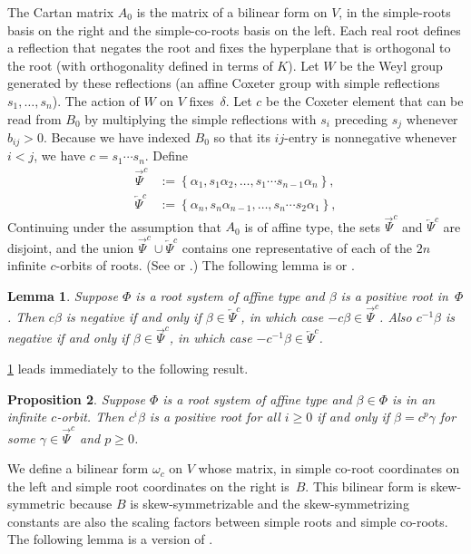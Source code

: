 \documentclass{amsart}
\newtheorem{proposition}{Proposition}[section]
\newtheorem{lemma}[proposition]{Lemma}
\theoremstyle{definition}
\theoremstyle{remark}
\numberwithin{equation}{section}
\newcommand{\set}[1]{{\left\lbrace #1 \right\rbrace}}
\newcommand{\0}{{\mathbf{0}}}
\newcommand{\RSChar}{\Phi}
\newcommand{\RS}{\RSChar}
\newcommand{\TravInfChar}{\Psi}
\newcommand{\TravProj}[1]{\overrightarrow{\TravInfChar}^{#1}}
\newcommand{\TravInj}[1]{\overleftarrow{\TravInfChar}^{#1}}
\begin{document}
The Cartan matrix $A_0$ is the matrix of a bilinear form on $V$, in the simple-roots basis on the right and the simple-co-roots basis on the left.
Each real root defines a reflection that negates the root and fixes the hyperplane that is orthogonal to the root (with orthogonality defined in terms of $K$).
Let $W$ be the Weyl group generated by these reflections (an affine Coxeter  group with simple reflections $s_1,\ldots,s_n$).
The action of $W$ on $V$ fixes~$\delta$.
Let $c$ be the Coxeter element that can be read from $B_0$ by multiplying the simple reflections with $s_i$ preceding $s_j$ whenever $b_{ij}>0$.
Because we have indexed $B_0$ so that its $ij$-entry is nonnegative whenever $i<j$, we have $c=s_1\cdots s_n$.
Define
\begin{align}
\label{rep->}
\TravProj{c}&:=\set{\alpha_1,s_1\alpha_2,\ldots,s_1\cdots s_{n-1}\alpha_n},\\
\label{rep<-}
\TravInj{c}&:=\set{\alpha_n,s_n\alpha_{n-1},\ldots,s_n\cdots s_2\alpha_1},
\end{align}%
Continuing under the assumption that $A_0$ is of affine type, the sets $\TravProj{c}$ and $\TravInj{c}$ are disjoint, and the union $\TravProj{c}\cup\TravInj{c}$ contains one representative of each of the $2n$ infinite $c$-orbits of roots.
(See \cite[Chapter~1]{Dlab-Ringel} or \cite[Theorem~1.2]{afforb}.)
The following lemma is \cite[Lemma~1.6]{Dlab-Ringel} or \cite[Lemma~4.1]{afforb}.

\begin{lemma}\label{c to pos}
Suppose $\RS$ is a root system of affine type and $\beta$ is a positive root in~$\RS$. 
Then $c\beta$ is negative if and only if $\beta\in\TravInj{c}$, in which case $-c\beta\in\TravProj{c}$.
Also $c^{-1}\beta$ is negative if and only if $\beta\in\TravProj{c}$, in which case $-c^{-1}\beta\in\TravInj{c}$.
\end{lemma}

\cref{c to pos} leads immediately to the following result.
\begin{proposition}\label{who is pos}
Suppose $\RS$ is a root system of affine type and $\beta\in\RS$ is in an infinite $c$-orbit.
Then $c^i\beta$ is a positive root for all $i\ge0$ if and only if $\beta=c^p\gamma$ for some $\gamma\in\TravProj{c}$ and $p\ge0$.
\end{proposition}

We define a bilinear form $\omega_c$ on $V$ whose matrix, in simple co-root coordinates on the left and simple root coordinates on the right is~$B$.
This bilinear form is skew-symmetric because $B$ is skew-symmetrizable and the skew-symmetrizing constants are also the scaling factors between simple roots and simple co-roots.
The following lemma is a version of \cite[Lemma~3.8]{typefree}.
\end{document}
